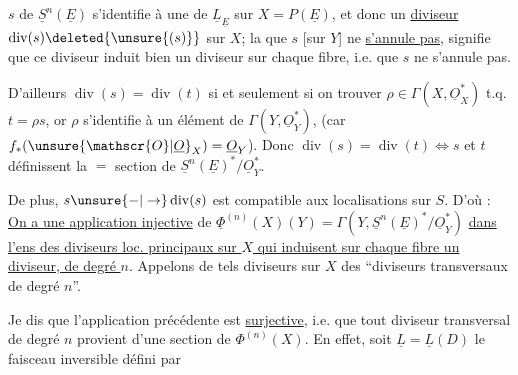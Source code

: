  $s$ de $\underline{S}^{n}(\underline{E})$ s'identifie à une  de $\underline{L}_{\underline{E}}$ sur $X=P(\underline{E})$, et   donc un \uline{diviseur} $\operatorname{div}(s)\deleted{\unsure{(s)}}$ sur $X$; la  que $s$ [sur $Y$] ne \uline{s'annule pas}, signifie que ce diviseur induit bien un diviseur sur chaque fibre,  i.e. que $s$ ne s'annule pas.

D'ailleurs  $\operatorname{div}(s)=\operatorname{div}(t)$  si et seulement si on  trouver $\rho\in\Gamma(X,\underline{O}_X^*)$ t.q. $t=\rho s$, or $\rho$ s'identifie à un élément de $\Gamma(Y,\underline{O}_Y^*)$, (car $f_*(\unsure{\mathscr{O}|\underline{O}}_X)=\underline{O}_Y$). Donc $\operatorname{div}(s)=\operatorname{div}(t)\Leftrightarrow s$ et $t$ définissent la $=$ section de $\underline{S}^{n}(\underline{E})^*/\underline{O}_Y^*$.

De plus, $s\unsure{-|\to}\operatorname{div}(s)$ est compatible aux localisations sur $S$. D'où : \uline{On a une application injective} de \deleted{$\unsure{\Phi|\varphi}$} $\underline{\Phi}^{(n)}(X)(Y)=\Gamma(Y,\underline{S}^{n}(\underline{E})^*/\underline{O}_Y^*)$ \uline{dans l'ens des diviseurs loc. principaux  sur $X$ qui induisent  sur chaque fibre un diviseur,  de degré $n$}. Appelons de tels diviseurs sur $X$ des ``diviseurs transversaux de degré $n$''.

Je dis que l'application précédente est \uline{surjective}, i.e. que tout diviseur transversal  de degré $n$ provient d'une section de $\Phi^{(n)}(X)$. En effet, soit $\underline{L}=\underline{L}(D)$ le faisceau inversible défini par
